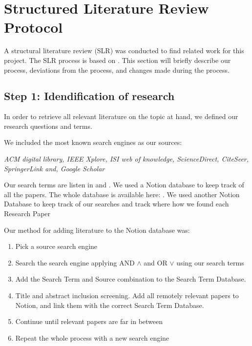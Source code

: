 
\section{Structured Literature Review Protocol}
\label{section:BT:SLR}

A structural literature review (SLR) was conducted to find related work for this project.
The SLR process is based on \cite{AndersKofod-Petersen2018}.
This section will briefly describe our process, deviations from the process,
and changes made during the process.

\subsection{Step 1: Idendification of research}
In order to retrieve all relevant literature on the topic at hand, we defined our
research questions and terms.

We included the most known search engines as our sources:

\textit{
  ACM digital library,
  IEEE Xplore,
  ISI web of knowledge,
  ScienceDirect,
  CiteSeer,
  SpringerLink and,
  Google Scholar
}

Our search terms are listen in  and .
We used a Notion database to keep track of all the papers. The whole database is available here: \cite{slrdatabase}.
We used another Notion Database to keep track of our searches and track where how we found each Research Paper
\cite{searchtermtable}

Our method for adding literature to the Notion database was:
\begin{enumerate}
  \item Pick a source search engine
  \item Search the search engine applying AND $\wedge$ and OR $\vee$ using our search terms
  \item Add the Search Term and Source combination to the Search Term Database.
  \item Title and abstract inclusion screening. Add all remotely relevant papers to Notion, and link them with the correct Search Term Database.
  \item Continue until relevant papers are far in between
  \item Repeat the whole process with a new search engine
\end{enumerate}

